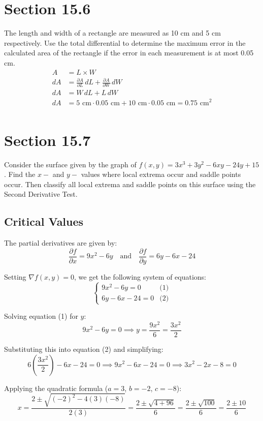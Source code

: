 \documentclass[letter,11pt]{article}
\begin{document}
\section*{Section 15.6}
The length and width of a rectangle are measured as 10 cm and 5 cm respectively. Use the total differential
to determine the maximum error in the calculated area of the rectangle if the error in each measurement is at most 0.05 cm.
\begin{align*}
    A & =L \times W \\
    dA &= \frac{\partial A}{\partial L} \, dL + \frac{\partial A}{\partial W} \, dW \\
    dA &= W \, dL + L\, dW \\
    dA &= 5 \text{ cm} \cdot  0.05 \text{ cm} + 10 \text{ cm} \cdot  0.05 \text{ cm}  = 0.75 \text{ cm}^2\\
\end{align*}


\section*{Section 15.7}
Consider the surface given by the graph of $f (x, y) = 3x^3 + 3y^2 - 6xy - 24y + 15$. Find the $x-$ and $y-$ values where local extrema occur and saddle points occur. Then classify all local extrema and saddle points on this surface using the Second Derivative Test.

\subsection*{Critical Values}
The partial derivatives are given by:
\[
\frac{\partial f}{\partial x} = 9x^2 - 6y \quad \text{and} \quad \frac{\partial f}{\partial y} = 6y - 6x - 24
\]

Setting $\nabla f(x, y) = 0$, we get the following system of equations:
\[
\begin{cases}
9x^2 - 6y = 0 & \text{(1)} \\
6y - 6x - 24 = 0 & \text{(2)}
\end{cases}
\]

Solving equation (1) for $y$:
\[
9x^2 - 6y = 0 \implies y = \frac{9x^2}{6} = \frac{3x^2}{2}
\]

Substituting this into equation (2) and simplifying:
\[
6\left(\frac{3x^2}{2}\right) - 6x - 24 = 0 \implies 9x^2 - 6x - 24 = 0 \implies 3x^2 - 2x - 8 = 0
\]

Applying the quadratic formula ($a = 3$, $b = -2$, $c = -8$):
\[
x = \frac{2 \pm \sqrt{(-2)^2 - 4(3)(-8)}}{2(3)} = \frac{2 \pm \sqrt{4 + 96}}{6} = \frac{2 \pm \sqrt{100}}{6} = \frac{2 \pm 10}{6}
\]
\end{document}
